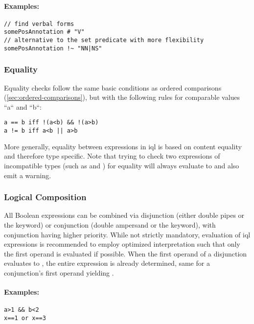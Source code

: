\documentclass[11pt,a4paper]{report}
\begin{document}
\paragraph{Examples:}

\begin{Verbatim}[samepage=true]
// find verbal forms
somePosAnnotation # "V"       
// alternative to the set predicate with more flexibility
somePosAnnotation !~ "NN|NS"   
\end{Verbatim}

\subsubsection{Equality}
\label{sec:equality}

Equality checks follow the same basic conditions as ordered comparisons (\ref{sec:ordered-comparisons}), but with the following rules for comparable values ``a`` and ``b``:

\begin{Verbatim}[samepage=true]
a == b iff !(a<b) && !(a>b)
a != b iff a<b || a>b
\end{Verbatim}

\noindent More generally, equality between expressions in \ac{iql} is based on content equality and therefore type specific.
Note that trying to check two expressions of incompatible types (such as  and ) for equality will always evaluate to  and also emit a warning. 

\subsubsection{Logical Composition}
\label{sec:logical-composition}

All Boolean expressions can be combined via disjunction (either double pipes \lit{||} or the  keyword) or conjunction (double ampersand \lit{\&\&} or the  keyword), with conjunction having higher priority. 
While not strictly mandatory, evaluation of \ac{iql} expressions is recommended to employ optimized interpretation such that only the first operand is evaluated if possible. 
When the first operand of a disjunction evaluates to , the entire expression is already determined, same for a conjunction's first operand yielding .

\paragraph{Examples:}
\begin{Verbatim}[samepage=true]
a>1 && b<2
x==1 or x==3
\end{Verbatim}
\end{document}
